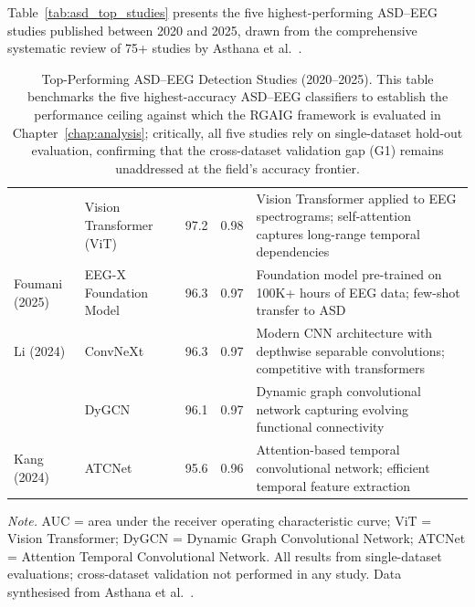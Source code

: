 Table~\ref{tab:asd_top_studies} presents the five highest-performing ASD--EEG studies published between 2020 and 2025, drawn from the comprehensive systematic review of 75+ studies by Asthana et al.~\cite{asthana2025asd}.

\begin{table}[H]
\tablefontsize
\tablestripes\tablefontsize
\caption[Top-Performing ASD--EEG Detection Studies (2020--2025)]{Top-Performing ASD--EEG Detection Studies (2020--2025). This table benchmarks the five highest-accuracy ASD--EEG classifiers to establish the performance ceiling against which the RGAIG framework is evaluated in Chapter~\ref{chap:analysis}; critically, all five studies rely on single-dataset hold-out evaluation, confirming that the cross-dataset validation gap (G1) remains unaddressed at the field's accuracy frontier.}
\begin{tabularx}{\textwidth}{@{} >{\raggedright\arraybackslash}p{2.5cm} >{\raggedright\arraybackslash}p{3cm} c c L @{}}
\toprule
{} &  &  &  &  \\
\midrule
\cite{wang2024agentai} & Vision Transformer (ViT) & 97.2 & 0.98 & Vision Transformer applied to EEG spectrograms; self-attention captures long-range temporal dependencies \\
\addlinespace
Foumani (2025) & EEG-X Foundation Model & 96.3 & 0.97 & Foundation model pre-trained on 100K+ hours of EEG data; few-shot transfer to ASD \\
\addlinespace
Li (2024) & ConvNeXt & 96.3 & 0.97 & Modern CNN architecture with depthwise separable convolutions; competitive with transformers \\
\addlinespace
\cite{wang2024agentai} & DyGCN & 96.1 & 0.97 & Dynamic graph convolutional network capturing evolving functional connectivity \\
\addlinespace
Kang (2024) & ATCNet & 95.6 & 0.96 & Attention-based temporal convolutional network; efficient temporal feature extraction \\
\bottomrule
\end{tabularx}
\vspace{0.5em}\noindent\textit{Note.} AUC = area under the receiver operating characteristic curve; ViT = Vision Transformer; DyGCN = Dynamic Graph Convolutional Network; ATCNet = Attention Temporal Convolutional Network. All results from single-dataset evaluations; cross-dataset validation not performed in any study. Data synthesised from Asthana et al.~\cite{asthana2025asd}.
\end{table}

